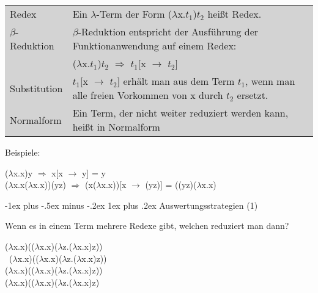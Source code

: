 \documentclass[10pt]{article}
\makeatletter
\renewcommand{\subsubsection}{\@startsection{subsubsection}{3}{0mm}%
                                {-1ex plus -.5ex minus -.2ex}%
                                {1ex plus .2ex}%
                                {\normalfont\small\bfseries}}
\makeatother
\begin{document}
\begin{itemize*}
\colorbox{lightgray}{ \begin{minipage}[h]{1.0\linewidth}
    \begin{tabular}{|p{4cm}|p{7cm}|}
      Redex             & Ein $\lambda$-Term der Form ($\lambda$x.$t_1$)$t_2$ heißt Redex.                                                      \\[\normalbaselineskip]
      $\beta$-Reduktion & $\beta$-Reduktion entspricht der Ausführung der Funktionanwendung auf einem Redex:                                    \\[\normalbaselineskip]
                        & ($\lambda$x.$t_1$)$t_2$ $\Rightarrow$ $t_1$[x $\rightarrow$ $t_2$]                                                    \\[\normalbaselineskip]
      Substitution      & $t_1$[x $\rightarrow$ $t_2$] erhält man aus dem Term $t_1$, wenn man alle freien Vorkommen von x durch $t_2$ ersetzt. \\[\normalbaselineskip]
      Normalform        & Ein Term, der nicht weiter reduziert werden kann, heißt in Normalform	 
    \end{tabular}
  \end{minipage}
}

Beispiele:   
\begin{center}
  ($\lambda$x.x)y $\Rightarrow$ x[x $\rightarrow$ y] = y \\[\normalbaselineskip]
  ($\lambda$x.x($\lambda$x.x))(yz) $\Rightarrow$ (x($\lambda$x.x))[x $\rightarrow$ (yz)] = ((yz)($\lambda$x.x)
\end{center}

\subsubsection{Auswertungsstrategien (1)}

Wenn es in einem Term mehrere Redexe gibt, welchen reduziert man dann?

\begin{center}
  ($\lambda$x.x)(($\lambda$x.x)($\lambda$z.($\lambda$x.x)z))\\
  \ ($\lambda$\color{blue}x.x\color{black})\color{red}(($\lambda$x.x)($\lambda$z.($\lambda$x.x)z)) \color{black}\\
  ($\lambda$x.x)(($\lambda$\color{blue}x.x\color{black})\color{red}($\lambda$z.($\lambda$x.x)z)\color{black})\\
  ($\lambda$x.x)(($\lambda$x.x)($\lambda$z.($\lambda$\color{blue}x.x\color{black})\color{red}z\color{black})\\
  

\end{center}
\end{itemize*}
\end{document}
